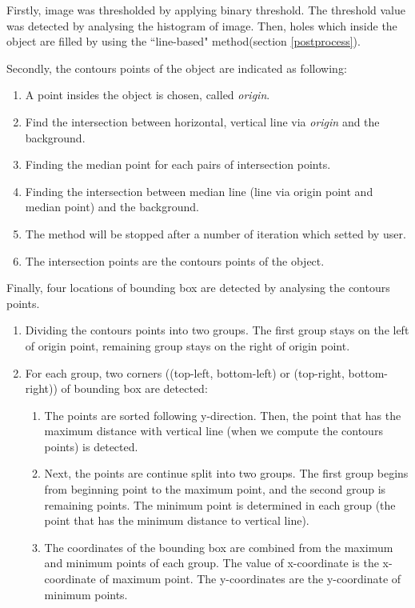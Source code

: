 Firstly, image was thresholded by applying binary threshold. The threshold value was detected by analysing the histogram of image. Then, holes which inside the object are filled by using the ``line-based" method(section \ref{postprocess}).

Secondly, the contours points of the object are indicated as following:
\begin{enumerate}
	\item A point insides the object is chosen, called \textit{origin}.
	\item Find the intersection between horizontal, vertical line via \textit{origin} and the background.
	\item Finding the median point for each pairs of intersection points. 
	\item Finding the intersection between median line (line via origin point and median point) and the background. 
	\item The method will be stopped after a number of iteration which setted by user.
	\item The intersection points are the contours points of the object.
\end{enumerate}


Finally, four locations of bounding box are detected by analysing the contours points.
\begin{enumerate}
	\item Dividing the contours points into two groups. The first group stays on the left of origin point, remaining group stays on the right of origin point.
	\item For each group, two corners ((top-left, bottom-left) or (top-right, bottom-right)) of bounding box are detected:
		\begin{enumerate}
			\item The points are sorted following y-direction. 
			Then, the point that has the maximum distance with vertical line (when we compute the contours points) is detected.		
			\item Next, the points are continue split into two groups. The first group begins from beginning point to the maximum point, and the second group is remaining points. The minimum point is determined in each group (the point that has the minimum distance to vertical line).
			\item The coordinates of the bounding box are combined from the maximum and minimum points of each group. The value of x-coordinate is the x-coordinate of maximum point. The y-coordinates are the y-coordinate of minimum points.
		\end{enumerate}			
\end{enumerate}
